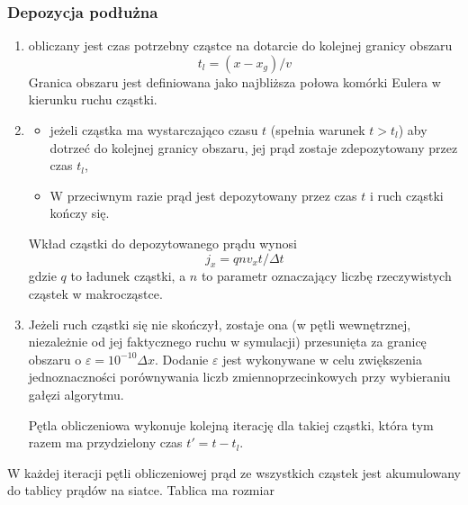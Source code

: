 \subsubsection{Depozycja podłużna} %
\begin{enumerate}
    \item obliczany jest czas potrzebny cząstce na dotarcie do kolejnej
    granicy obszaru
    \begin{equation}
        t_l = (x - x_g)/v
    \end{equation}
    Granica obszaru jest definiowana jako najbliższa połowa komórki Eulera w kierunku
    ruchu cząstki.
    \item
    \begin{itemize}
        \item jeżeli cząstka ma wystarczająco czasu $t$ (spełnia warunek $t > t_l$) aby
        dotrzeć do kolejnej granicy obszaru, jej prąd zostaje zdepozytowany przez czas $t_l$,
        \item W przeciwnym razie prąd jest depozytowany przez czas $t$ i ruch cząstki kończy się.
    \end{itemize}
    Wkład cząstki do depozytowanego prądu wynosi
    \begin{equation}
        j_x = q n v_x t/\Delta t
    \end{equation}
    gdzie $q$ to ładunek cząstki, a $n$ to parametr  oznaczający liczbę
    rzeczywistych cząstek w makrocząstce.

    \item Jeżeli ruch cząstki się nie skończył, zostaje ona (w pętli
    wewnętrznej, niezależnie od jej faktycznego ruchu w symulacji)
     przesunięta za granicę obszaru o $\varepsilon =
    10^{-10} \Delta x$. Dodanie $\varepsilon$ jest wykonywane w celu zwiększenia
    jednoznaczności porównywania liczb zmiennoprzecinkowych przy wybieraniu
    gałęzi algorytmu.

    Pętla obliczeniowa wykonuje kolejną iterację dla takiej cząstki, która tym razem
    ma przydzielony czas $t' = t - t_l$.

\end{enumerate}

W każdej iteracji pętli obliczeniowej prąd ze wszystkich cząstek jest
akumulowany do tablicy prądów na siatce. Tablica ma rozmiar  

